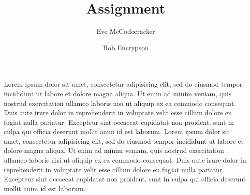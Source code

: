 \documentclass[a4paper, 12pt, twosided, signature]{ucmaths}
\title{Assignment}
\author{Eve McCodecracker \and Bob Encrypson}
\begin{document}
    \maketitle
    Lorem ipsum dolor sit amet, consectetur adipisicing elit, sed do eiusmod tempor incididunt ut labore et dolore magna aliqua. Ut enim ad minim veniam, quis nostrud exercitation ullamco laboris nisi ut aliquip ex ea commodo consequat. Duis aute irure dolor in reprehenderit in voluptate velit esse cillum dolore eu fugiat nulla pariatur. Excepteur sint occaecat cupidatat non proident, sunt in culpa qui officia deserunt mollit anim id est laborum.
    \clearpage
    Lorem ipsum dolor sit amet, consectetur adipisicing elit, sed do eiusmod tempor incididunt ut labore et dolore magna aliqua. Ut enim ad minim veniam, quis nostrud exercitation ullamco laboris nisi ut aliquip ex ea commodo consequat. Duis aute irure dolor in reprehenderit in voluptate velit esse cillum dolore eu fugiat nulla pariatur. Excepteur sint occaecat cupidatat non proident, sunt in culpa qui officia deserunt mollit anim id est laborum.
\end{document}
